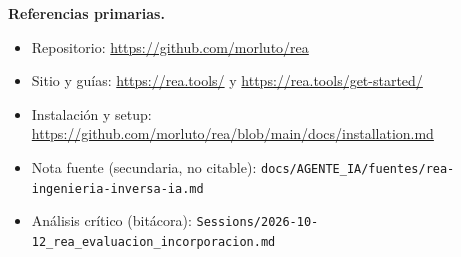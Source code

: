 \documentclass[11pt,a4paper]{article}
\begin{document}
\textbf{Referencias primarias.}
\begin{itemize}[leftmargin=1.4em]
  \item Repositorio: \url{https://github.com/morluto/rea}
  \item Sitio y guías: \url{https://rea.tools/} y \url{https://rea.tools/get-started/}
  \item Instalación y setup: \url{https://github.com/morluto/rea/blob/main/docs/installation.md}
  \item Nota fuente (secundaria, no citable):
  \texttt{docs/AGENTE\_IA/fuentes/rea-ingenieria-inversa-ia.md}
  \item Análisis crítico (bitácora):
  \texttt{Sessions/2026-10-12\_rea\_evaluacion\_incorporacion.md}
\end{itemize}
\end{document}
